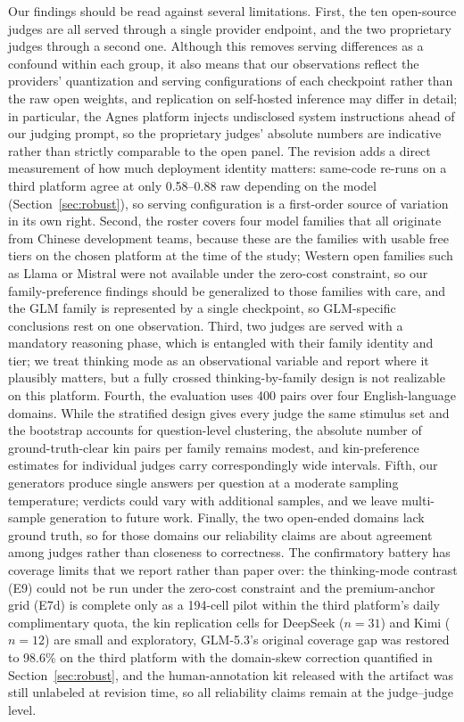 \documentclass[review,12pt]{elsarticle}
\begin{document}
Our findings should be read against several limitations. First, the ten
open-source judges are all served through a single provider endpoint, and the
two proprietary judges through a second one. Although this removes serving
differences as a confound within each group, it also means that our
observations reflect the providers' quantization and serving configurations
of each checkpoint rather than the raw open weights, and replication on
self-hosted inference may differ in detail; in particular, the Agnes platform
injects undisclosed system instructions ahead of our judging prompt, so the
proprietary judges' absolute numbers are indicative rather than strictly
comparable to the open panel. The revision adds a direct measurement of
how much deployment identity matters: same-code re-runs on a third
platform agree at only 0.58--0.88 raw depending on the model
(Section~\ref{sec:robust}), so serving configuration is a first-order
source of variation in its own right. Second, the roster covers four
model families that all originate from Chinese development teams, because
these are the families with usable free tiers on the chosen platform at the
time of the study; Western open families such as Llama or Mistral were not
available under the zero-cost constraint, so our family-preference findings
should be generalized to those families with care, and the GLM family is
represented by a single checkpoint, so GLM-specific conclusions rest on one
observation. Third, two judges are
served with a mandatory reasoning phase, which is entangled with their
family identity and tier; we treat thinking mode as an observational
variable and report where it plausibly matters, but a fully crossed
thinking-by-family design is not realizable on this platform. Fourth, the
evaluation uses 400 pairs over four English-language domains. While the
stratified design gives every judge the same stimulus set and the bootstrap
accounts for question-level clustering, the absolute number of
ground-truth-clear kin pairs per family remains modest, and kin-preference
estimates for individual judges carry correspondingly wide intervals. Fifth,
our generators produce single answers per question at a moderate sampling
temperature; verdicts could vary with additional samples, and we leave
multi-sample generation to future work. Finally, the two open-ended domains
lack ground truth, so for those domains our reliability claims are about agreement among
judges rather than closeness to correctness. The confirmatory battery has
coverage limits that we report rather than paper over: the thinking-mode contrast (E9) could not be run under the zero-cost
constraint and the premium-anchor grid (E7d) is complete only as a
194-cell pilot within the third platform's daily complimentary quota, the kin replication cells for DeepSeek ($n=31$)
and Kimi ($n=12$) are small and exploratory, GLM-5.3's original coverage gap was restored to 98.6\% on the third
platform with the domain-skew correction quantified in
Section~\ref{sec:robust}, and the
human-annotation kit released with the artifact was still unlabeled at
revision time, so all reliability claims remain at the judge--judge
level.
\end{document}
